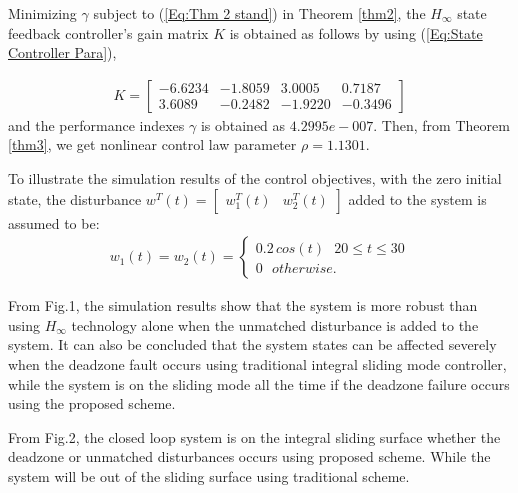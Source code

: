 \documentclass[journal,onecolumn]{IEEEtran}
\begin{document}
Minimizing $\gamma$ subject to (\ref{Eq:Thm 2 stand}) in Theorem
\ref{thm2}, the $H_{\infty}$ state feedback controller's gain matrix
$K$ is obtained as follows by using (\ref{Eq:State Controller
Para}),

\begin{equation*}
\begin{array}{c} K=\left[\begin{array}{cccc}
   -6.6234& -1.8059&  3.0005& 0.7187\\
   3.6089 &  -0.2482 &  -1.9220&   -0.3496 \end{array}\right]
\end{array}
\end{equation*}
and the performance indexes $\gamma$ is obtained as $4.2995e-007$.
Then, from Theorem \ref{thm3}, we get nonlinear control law
parameter $\rho=1.1301$.


To illustrate the simulation results of the control objectives, with
the zero initial state, the disturbance
$w^T(t)=\left[\begin{array}{cc}w_1^T(t)&w_2^T(t)\end{array}\right]$
added to the system is assumed to be:
\begin{equation}
\label{EQ:Disturbance input}
\begin{array}{l}w_1(t)=w_2(t)=\left\{\begin{array}{llc} 0.2\, cos(t)
\,\,\,\, 20\leq t\leq 30\\0\,\,\,\,
otherwise.\end{array}\right.\end{array}
\end{equation}

From Fig.1, the simulation results  show that the system is more
robust than using $H_{\infty}$ technology alone when the unmatched
disturbance is added to the system. It can also be concluded that
the system states can be affected severely when the deadzone fault
occurs using traditional integral sliding mode controller, while the
system is on the sliding mode all the time if the deadzone failure
occurs using the proposed scheme.


From Fig.2, the closed loop system is on the integral sliding
surface whether the deadzone or unmatched disturbances occurs using
proposed scheme. While the system will be out of the sliding surface
using traditional scheme.
\end{document}
